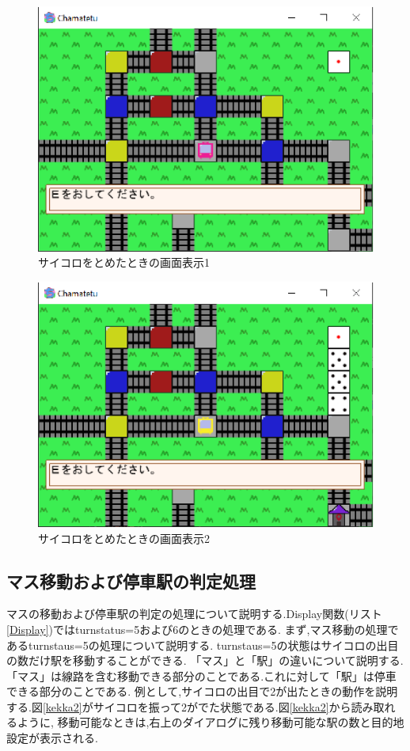 \documentclass[a4j]{jarticle}
\begin{document}
        \begin{figure}[H]
            \centering
            \includegraphics[scale=1.3]{saikoro1r.eps}
            \caption{サイコロをとめたときの画面表示1}
             \label{dicestop1}
            \end{figure}   

        \begin{figure}[H]
            \centering
            \includegraphics[scale=1.3]{saikoro4r.eps}
            \caption{サイコロをとめたときの画面表示2}
             \label{dicestop4}
            \end{figure}   

    \subsection{マス移動および停車駅の判定処理}
    マスの移動および停車駅の判定の処理について説明する.Display関数(リスト\ref{Display})ではturnstatus=5および6のときの処理である.
    まず,マス移動の処理であるturnstaus=5の処理について説明する. turnstaus=5の状態はサイコロの出目の数だけ駅を移動することができる.
    「マス」と「駅」の違いについて説明する.「マス」は線路を含む移動できる部分のことである.これに対して「駅」は停車できる部分のことである. 
    例として,サイコロの出目で2が出たときの動作を説明する.図\ref{kekka2}がサイコロを振って2がでた状態である.図\ref{kekka2}から読み取れるように,
    移動可能なときは,右上のダイアログに残り移動可能な駅の数と目的地設定が表示される.
\end{document}
